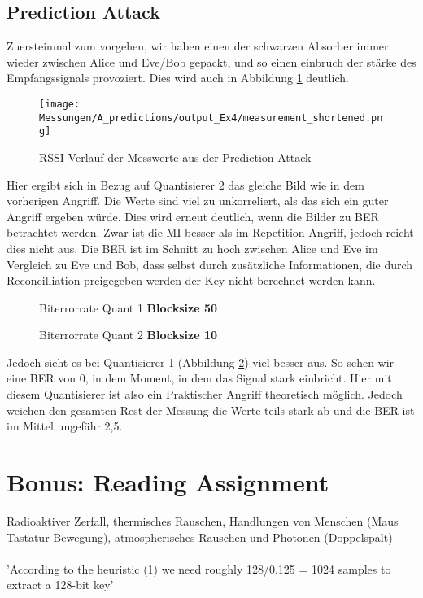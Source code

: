 \documentclass[12pt,a4paper]{article}
\begin{document}
\subsection*{Prediction Attack}
Zuersteinmal zum vorgehen, wir haben einen der schwarzen Absorber immer wieder zwischen Alice und Eve/Bob gepackt, und so einen einbruch der stärke des Empfangssignals provoziert. Dies wird auch in Abbildung \ref{fig:12} deutlich.\\
\begin{figure}[H]
\centering
\texttt{[image: Messungen/A\_predictions/output\_Ex4/measurement\_shortened.png]}
\caption{RSSI Verlauf der Messwerte aus der Prediction Attack}
\label{fig:12}
\end{figure}
Hier ergibt sich in Bezug auf Quantisierer 2 das gleiche Bild wie in dem vorherigen Angriff. Die Werte sind viel zu unkorreliert, als das sich ein guter Angriff ergeben würde. Dies wird erneut deutlich, wenn die Bilder zu BER betrachtet werden. Zwar ist die MI besser als im Repetition Angriff, jedoch reicht dies nicht aus. Die BER ist im Schnitt zu hoch zwischen Alice und Eve im Vergleich zu Eve und Bob, dass selbst durch zusätzliche Informationen, die durch Reconcilliation preigegeben werden der Key nicht berechnet werden kann.
\begin{figure}[H]
\centering
{} \qquad
{}  
\caption{Biterrorrate Quant 1 \textbf{Blocksize 50}}
\label{fig:13}
\end{figure}
\begin{figure}[H]
\centering
{} \qquad
{}  
\caption{Biterrorrate Quant 2 \textbf{Blocksize 10}}
\label{fig:14}
\end{figure}
Jedoch sieht es bei Quantisierer 1 (Abbildung \ref{fig:13}) viel besser aus. So sehen wir eine BER von 0, in dem Moment, in dem das Signal stark einbricht. Hier mit diesem Quantisierer ist also ein Praktischer Angriff theoretisch möglich. Jedoch weichen den gesamten Rest der Messung die Werte teils stark ab und die BER ist im Mittel ungefähr 2,5. 
\section{Bonus: Reading Assignment}
Radioaktiver Zerfall, thermisches Rauschen, Handlungen von Menschen (Maus Tastatur Bewegung), atmospherisches Rauschen und Photonen (Doppelspalt)\\
\\
'According to the heuristic (1) we need roughly 128/0.125 = 1024
samples to extract a 128-bit key'\\
\\
\end{document}
